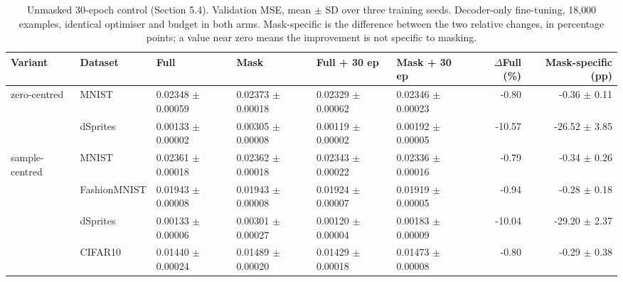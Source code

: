\begin{table}[t]
\caption{Unmasked 30-epoch control (Section 5.4). Validation MSE, mean $\pm$ SD over three training seeds. Decoder-only fine-tuning, 18{,}000 examples, identical optimiser and budget in both arms. Mask-specific is the difference between the two relative changes, in percentage points; a value near zero means the improvement is not specific to masking.}
\label{tab:full-control}
\begin{tabularx}{\textwidth}{llXXXXrr}
\toprule
Variant & Dataset & Full & Mask & Full + 30 ep & Mask + 30 ep & $\Delta$Full (\%) & Mask-specific (pp) \\
\midrule
zero-centred & MNIST & 0.02348 $\pm$ 0.00059 & 0.02373 $\pm$ 0.00018 & 0.02329 $\pm$ 0.00062 & 0.02346 $\pm$ 0.00023 & -0.80 & -0.36 $\pm$ 0.11 \\
 & dSprites & 0.00133 $\pm$ 0.00002 & 0.00305 $\pm$ 0.00008 & 0.00119 $\pm$ 0.00002 & 0.00192 $\pm$ 0.00005 & -10.57 & -26.52 $\pm$ 3.85 \\
\midrule
sample-centred & MNIST & 0.02361 $\pm$ 0.00018 & 0.02362 $\pm$ 0.00018 & 0.02343 $\pm$ 0.00022 & 0.02336 $\pm$ 0.00016 & -0.79 & -0.34 $\pm$ 0.26 \\
 & FashionMNIST & 0.01943 $\pm$ 0.00008 & 0.01943 $\pm$ 0.00008 & 0.01924 $\pm$ 0.00007 & 0.01919 $\pm$ 0.00005 & -0.94 & -0.28 $\pm$ 0.18 \\
 & dSprites & 0.00133 $\pm$ 0.00006 & 0.00301 $\pm$ 0.00027 & 0.00120 $\pm$ 0.00004 & 0.00183 $\pm$ 0.00009 & -10.04 & -29.20 $\pm$ 2.37 \\
 & CIFAR10 & 0.01440 $\pm$ 0.00024 & 0.01489 $\pm$ 0.00020 & 0.01429 $\pm$ 0.00018 & 0.01473 $\pm$ 0.00008 & -0.80 & -0.29 $\pm$ 0.38 \\
\bottomrule
\end{tabularx}
\end{table}